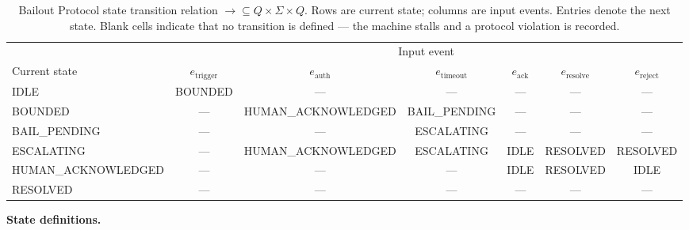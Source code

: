 \begin{table}[htbp]
\caption{Bailout Protocol state transition relation $\rightarrow \subseteq Q \times \Sigma \times Q$. Rows are current state; columns are input events. Entries denote the next state. Blank cells indicate that no transition is defined — the machine stalls and a protocol violation is recorded.}
\label{tab:bailout-transition}
\begin{tabular}{@{}lcccccc@{}}
\toprule
 & \multicolumn{6}{c}{Input event} \\
\cmidrule(l){2-7}
Current state & $e_{\text{trigger}}$ & $e_{\text{auth}}$ & $e_{\text{timeout}}$ & $e_{\text{ack}}$ & $e_{\text{resolve}}$ & $e_{\text{reject}}$ \\
\midrule
IDLE              & BOUNDED            & — & — & — & — & — \\
BOUNDED           & — & HUMAN\_ACKNOWLEDGED & BAIL\_PENDING & — & — & — \\
BAIL\_PENDING     & — & — & ESCALATING & — & — & — \\
ESCALATING        & — & HUMAN\_ACKNOWLEDGED & ESCALATING & IDLE & RESOLVED & RESOLVED \\
HUMAN\_ACKNOWLEDGED & — & — & — & IDLE & RESOLVED & IDLE \\
RESOLVED          & — & — & — & — & — & — \\
\bottomrule
\end{tabular}
\end{table}

\bigskip
\noindent\textbf{State definitions.}

